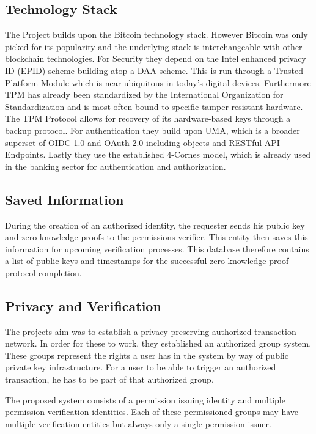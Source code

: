 \subsection{Technology Stack}
The Project builds upon the Bitcoin technology stack. However Bitcoin was only picked for its popularity and the underlying stack is interchangeable with other blockchain technologies.\cite[p.2]{hardjono2016anonymous} For Security they depend on the Intel enhanced privacy ID (EPID) scheme building atop a DAA scheme. This is run through a Trusted Platform Module which is near ubiquitous in today's digital devices. Furthermore TPM has already been standardized by the International Organization for Standardization and is most often bound to specific tamper resistant hardware. The TPM Protocol allows for recovery of its hardware-based keys through a backup protocol.\cite[p.2-3]{hardjono2016anonymous}
For authentication they build upon UMA, which is a broader superset of OIDC 1.0 and OAuth 2.0 including objects and RESTful API Endpoints.\cite[p.13-14]{hardjono2016anonymous}
Lastly they use the established 4-Cornes model, which is already used in the banking sector for authentication and authorization.\cite[p.13]{hardjono2016anonymous}

\subsection{Saved Information}
During the creation of an authorized identity, the requester sends his public key and zero-knowledge proofs to the permissions verifier. This entity then saves this information for upcoming verification processes. This database therefore contains a list of public keys and timestamps for the successful zero-knowledge proof protocol completion.\cite[p.5]{hardjono2016anonymous}

\subsection{Privacy and Verification}
The projects aim was to establish a privacy preserving authorized transaction network. In order for these to work, they established an authorized group system. These groups represent the rights a user has in the system by way of public private key infrastructure. For a user to be able to trigger an authorized transaction, he has to be part of that authorized group.

The proposed system consists of a permission issuing identity and multiple permission verification identities. Each of these permissioned groups may have multiple verification entities but always only a single permission issuer.\cite[p.5]{hardjono2016anonymous}

